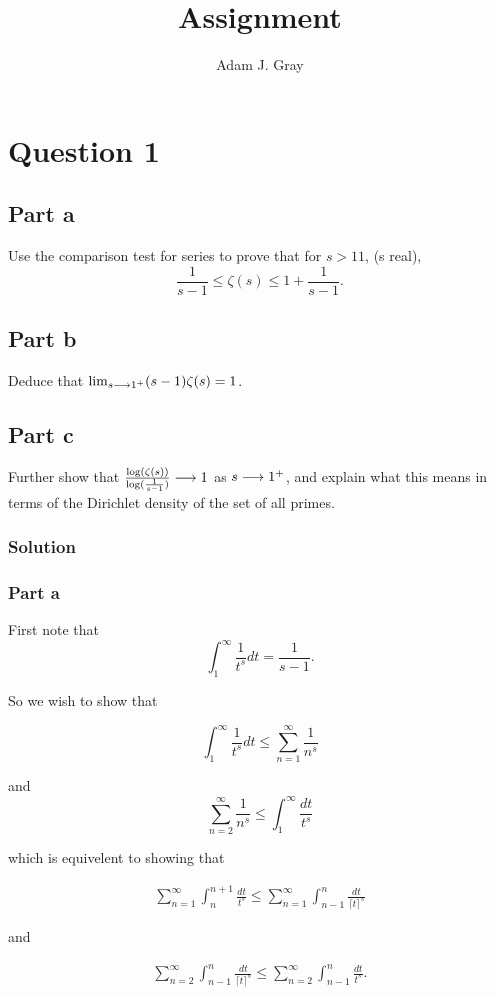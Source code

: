 \documentclass{unswmaths}
\begin{document}
\author{Adam J. Gray}
\subject{Number Theory}
\title{Assignment}

\unswtitle

\section*{Question 1}
\subsection*{Part a}
Use the comparison test for series to prove that for  $ s > 11 $, (s real),
$$
	\frac{1}{s-1} \leq \zeta(s) \leq 1 + \frac{1}{s-1}.
$$
\subsection*{Part b}
Deduce that $ \lim_{s \longrightarrow 1^+} (s-1)\zeta(s) = 1 $.
\subsection*{Part c}
Further show that $ \frac{\log(\zeta(s))}{\log(\frac{1}{s-1})} \longrightarrow 1 $ as $ s \longrightarrow 1^+ $, and explain what this means in terms of 
the Dirichlet density of the set of all primes.

\subsubsection*{Solution}

\subsubsection*{Part a}

First note that
$$
	\int_1^\infty \frac{1}{t^s} dt = \frac{1}{s-1}.
$$

So we wish to show that 

$$
	\int_1^\infty \frac{1}{t^s} dt \leq \sum_{n=1}^\infty \frac{1}{n^s}
$$

and
$$
	\sum_{n=2}^\infty \frac{1}{n^s} \leq \int_1^\infty \frac{dt}{t^s} 
$$

which is equivelent to showing that

\begin{align}
	\label{ineq-1}
	\sum_{n=1}^\infty \int_{n}^{n+1} \frac{dt}{t^s} \leq \sum_{n=1}^\infty \int_{n-1}^{n} \frac{dt}{\lceil t \rceil^s}
\end{align}

and

\begin{align}
	\label{ineq-2}
	\sum_{n=2}^\infty \int_{n-1}^{n} \frac{dt}{\lceil t \rceil^s} \leq \sum_{n=2}^\infty \int_{n-1}^n \frac{dt}{t^s}.
\end{align}
\end{document}
